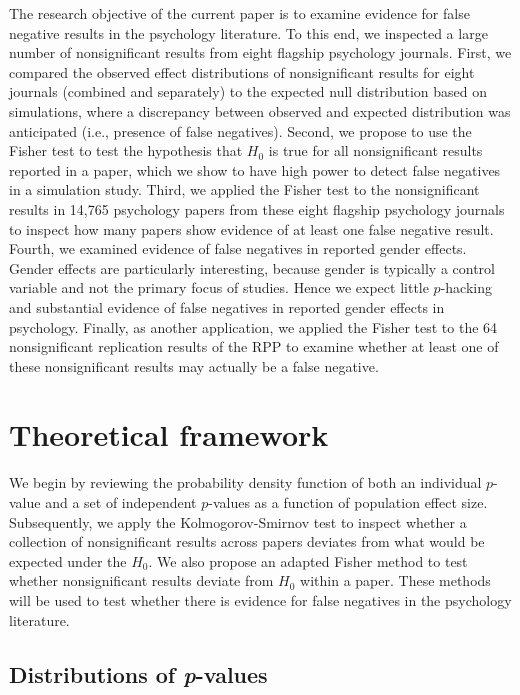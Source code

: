 \documentclass{article}
\begin{document}
The research objective of the current paper is to examine evidence for false negative results in the psychology literature. To this end, we inspected a large number of nonsignificant results from eight flagship psychology journals. First, we compared the observed effect distributions of nonsignificant results for eight journals (combined and separately) to the expected null distribution based on simulations, where a discrepancy between observed and expected distribution was anticipated (i.e., presence of false negatives). Second, we propose to use the Fisher test to test the hypothesis that $H_0$ is true for all nonsignificant results reported in a paper, which we show to have high power to detect false negatives in a simulation study. Third, we applied the Fisher test to the nonsignificant results in 14,765 psychology papers from these eight flagship psychology journals to inspect how many papers show evidence of at least one false negative result. Fourth, we examined evidence of false negatives in reported gender effects. Gender effects are particularly interesting, because gender is typically a control variable and not the primary focus of studies. Hence we expect little $p$-hacking and substantial evidence of false negatives in reported gender effects in psychology. Finally, as another application, we applied the Fisher test to the 64 nonsignificant replication results of the RPP \cite{Open_Science_Collaboration2015-zs} to examine whether at least one of these nonsignificant results may actually be a false negative. 

\section*{Theoretical framework}

We begin by reviewing the probability density function of both an individual $p$-value and a set of independent $p$-values as a function of population effect size. Subsequently, we apply the Kolmogorov-Smirnov test to inspect whether a collection of nonsignificant results across papers deviates from what would be expected under the $H_0$. We also propose an adapted Fisher method to test whether nonsignificant results deviate from $H_0$ within a paper. These methods will be used to test whether there is evidence for false negatives in the psychology literature.

\subsection*{Distributions of \textit{p}-values}
\end{document}
